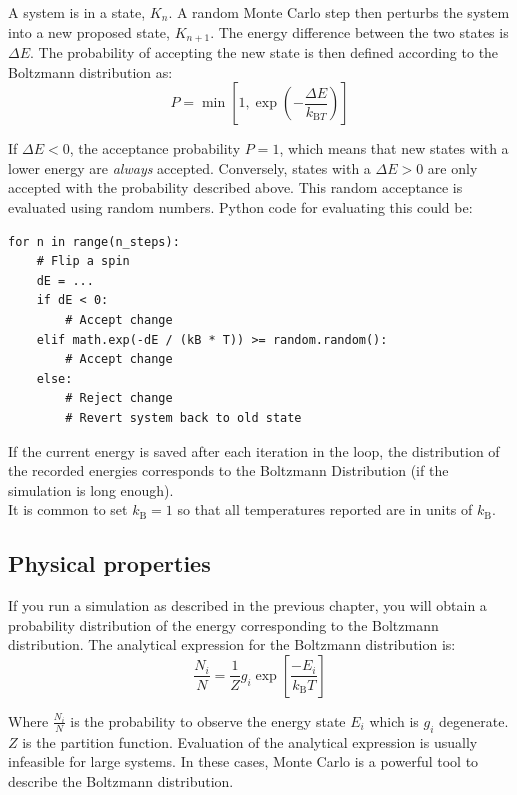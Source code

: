 \documentclass{article}
\begin{document}
A system is in a state, $K_n$. A random Monte Carlo step then perturbs the system into a new
proposed state, $K_{n+1}$. The energy difference between the two states is $\Delta E$.
The probability of accepting the new state is then defined according to the Boltzmann distribution as:
\begin{equation}
P = \min \left[1, \exp \left(-\frac{\Delta E}{k_{\mathrm{B}T}}\right) \right]
\end{equation} 

If $\Delta E < 0$, the acceptance probability $P = 1$, which means that new 
states with a lower energy are \textit{always} accepted.
Conversely, states with a $\Delta E > 0 $ are only accepted with the
probability described above. This random acceptance is evaluated using
random numbers.
Python code for evaluating this could be:
\begin{lstlisting}
for n in range(n_steps):
    # Flip a spin
    dE = ...
    if dE < 0:
        # Accept change
    elif math.exp(-dE / (kB * T)) >= random.random():
        # Accept change
    else:
        # Reject change
        # Revert system back to old state
\end{lstlisting}

If the current energy is saved after each iteration in the loop,
the distribution of the recorded energies corresponds to the
Boltzmann Distribution (if the simulation is long enough).\\

It is common to set $k_{\mathrm{B}} = 1$ so that all
temperatures reported are in units of $k_{\mathrm{B}}$.


\newpage
\subsection{Physical properties}
If you run a simulation as described in the previous chapter, you will obtain a
probability distribution of the energy corresponding to the Boltzmann distribution.
The analytical expression for the Boltzmann distribution is:
\begin{equation}
\frac{N_i}{N} = \frac{1}{Z} g_i \exp \left[ \frac{-E_i}{k_{\mathrm{B}}T} \right]
\end{equation}

Where $\frac{N_i}{N}$ is the probability to observe the
energy state $E_i$ which is $g_i$ degenerate.
$Z$ is the partition function.
Evaluation of the analytical expression is usually infeasible for large systems.
In these cases, Monte Carlo is a powerful tool to describe the Boltzmann distribution.
\end{document}
